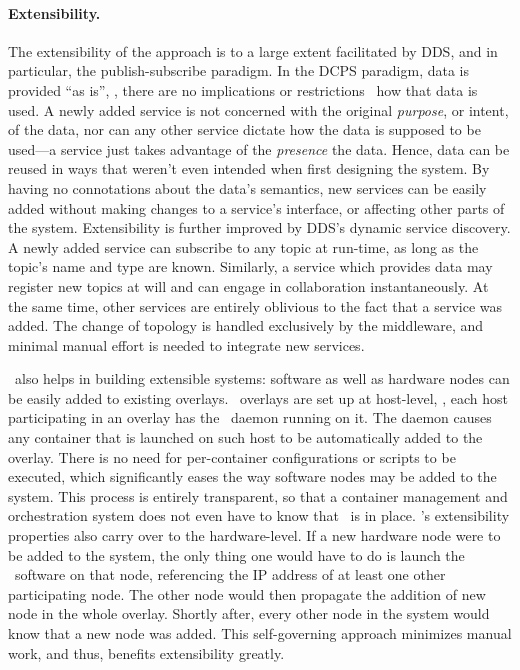 \paragraph{Extensibility.}
The extensibility of the approach is to a large extent facilitated by DDS, and in particular, the publish-subscribe paradigm. In the DCPS paradigm, data is provided ``as is'', \ie , there are no implications or restrictions \wrt\ how that data is used. A newly added service is not concerned with the original \emph{purpose}, or intent, of the data, nor can any other service dictate how the data is supposed to be used---a service just takes advantage of the \emph{presence} the data. Hence, data can be reused in ways that weren't even intended when first designing the system. By having no connotations about the data's semantics, new services can be easily added without making changes to a service's interface, or affecting other parts of the system. Extensibility is further improved by DDS's dynamic service discovery. A newly added service can subscribe to any topic at run-time, as long as the topic's name and type are known. Similarly, a service which provides data may register new topics at will and can engage in collaboration instantaneously. At the same time, other services are entirely oblivious to the fact that a service was added. The change of topology is handled exclusively by the middleware, and minimal manual effort is needed to integrate new services.

\wnet\ also helps in building extensible systems: software as well as hardware nodes can be easily added to existing overlays. \weave\ overlays are set up at host-level, \ie , each host participating in an overlay has the \weave\ daemon running on it. The daemon causes any container that is launched on such host to be automatically added to the overlay. There is no need for per-container configurations or scripts to be executed, which significantly eases the way software nodes may be added to the system. This process is entirely transparent, so that a container management and orchestration system does not even have to know that \weave\ is in place. \weave 's extensibility properties also carry over to the hardware-level. If a new hardware node were to be added to the system, the only thing one would have to do is launch the \weave\ software on that node, referencing the IP address of at least one other participating node. The other node would then propagate the addition of new node in the whole overlay. Shortly after, every other node in the system would know that a new node was added. This self-governing approach minimizes manual work, and thus, benefits extensibility greatly.

